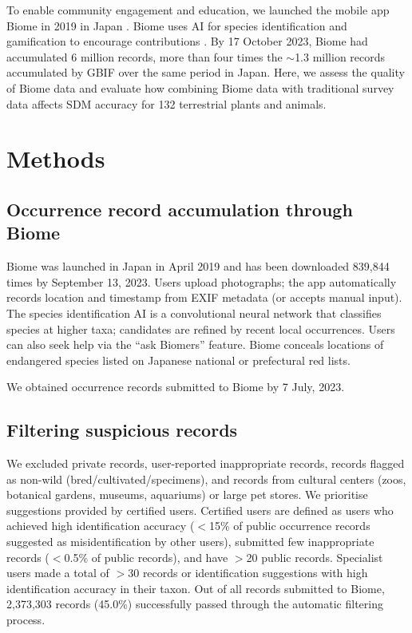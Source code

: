 \documentclass[11pt]{article}
\begin{document}
To enable community engagement and education, we launched the mobile app Biome in 2019 in Japan \citep{fujiki2021}. Biome uses AI for species identification and gamification to encourage contributions \citep{bowser2013,ponti2015,fujiki2021,koide2023}. By 17 October 2023, Biome had accumulated 6 million records, more than four times the $\sim$1.3 million records accumulated by GBIF over the same period in Japan. Here, we assess the quality of Biome data and evaluate how combining Biome data with traditional survey data affects SDM accuracy for 132 terrestrial plants and animals.

\section{Methods}
\subsection{Occurrence record accumulation through Biome}
Biome was launched in Japan in April 2019 and has been downloaded 839,844 times by September 13, 2023. Users upload photographs; the app automatically records location and timestamp from EXIF metadata (or accepts manual input). The species identification AI is a convolutional neural network that classifies species at higher taxa; candidates are refined by recent local occurrences. Users can also seek help via the ``ask Biomers'' feature. Biome conceals locations of endangered species listed on Japanese national or prefectural red lists.

We obtained occurrence records submitted to Biome by 7 July, 2023.

\subsection{Filtering suspicious records}
We excluded private records, user-reported inappropriate records, records flagged as non-wild (bred/cultivated/specimens), and records from cultural centers (zoos, botanical gardens, museums, aquariums) or large pet stores. We prioritise suggestions provided by certified users. Certified users are defined as users who achieved high identification accuracy ($<$15\% of public occurrence records suggested as misidentification by other users), submitted few inappropriate records ($<$0.5\% of public records), and have $>$20 public records. Specialist users made a total of $>$30 records or identification suggestions with high identification accuracy in their taxon. Out of all records submitted to Biome, 2,373,303 records (45.0\%) successfully passed through the automatic filtering process.
\end{document}
